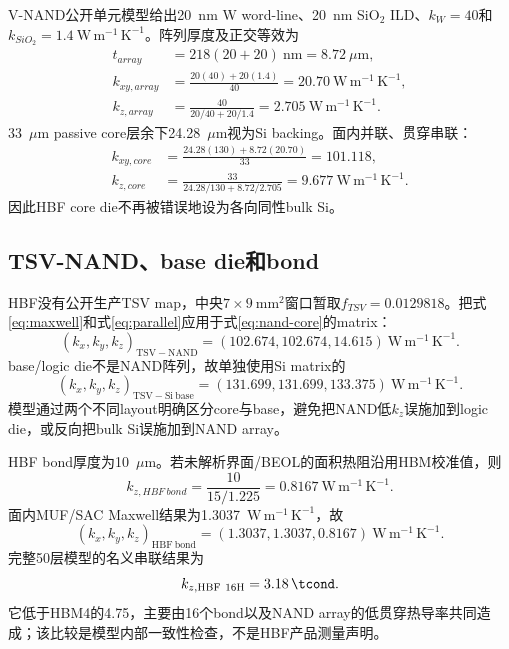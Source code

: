 \documentclass[UTF8,zihao=-4]{ctexart}
\newcommand{\kxyz}{(k_x,k_y,k_z)}
\newcommand{\unitk}{\mathrm{W\,m^{-1}\,K^{-1}}}
\begin{document}
V-NAND公开单元模型给出20~nm W word-line、20~nm SiO$_2$ ILD、$k_W=40$和$k_{SiO_2}=1.4~\unitk$\cite{KimRyuLee2025}。阵列厚度及正交等效为
\begin{align}
  t_{array}&=218(20+20)~\mathrm{nm}=8.72~\mu\mathrm{m},\\
  k_{xy,array}&=\frac{20(40)+20(1.4)}{40}=20.70~\unitk,\\
  k_{z,array}&=\frac{40}{20/40+20/1.4}=2.705~\unitk.
\end{align}
33~$\mu\mathrm{m}$ passive core层余下24.28~$\mu\mathrm{m}$视为Si backing。面内并联、贯穿串联：
\begin{align}
  k_{xy,core}&=\frac{24.28(130)+8.72(20.70)}{33}=101.118,\\
  k_{z,core}&=\frac{33}{24.28/130+8.72/2.705}=9.677~\unitk.
  \label{eq:nand-core}
\end{align}
因此HBF core die不再被错误地设为各向同性bulk Si。

\subsection{TSV-NAND、base die和bond}

HBF没有公开生产TSV map，中央$7\times9~\mathrm{mm^2}$窗口暂取$f_{TSV}=0.0129818$。把式\eqref{eq:maxwell}和式\eqref{eq:parallel}应用于式\eqref{eq:nand-core}的matrix：
\begin{equation}
  \kxyz_{\mathrm{TSV-NAND}}=(102.674,102.674,14.615)~\unitk.
\end{equation}
base/logic die不是NAND阵列，故单独使用Si matrix的
\begin{equation}
  \kxyz_{\mathrm{TSV-Si\ base}}=(131.699,131.699,133.375)~\unitk.
\end{equation}
模型通过两个不同layout明确区分core与base，避免把NAND低$k_z$误施加到logic die，或反向把bulk Si误施加到NAND array。

HBF bond厚度为10~$\mu\mathrm{m}$。若未解析界面/BEOL的面积热阻沿用HBM校准值，则
\begin{equation}
  k_{z,HBF\ bond}=\frac{10}{15/1.225}=0.8167~\unitk.
\end{equation}
面内MUF/SAC Maxwell结果为1.3037~$\unitk$，故
\begin{equation}
  \kxyz_{\mathrm{HBF\ bond}}=(1.3037,1.3037,0.8167)~\unitk.
\end{equation}
完整50层模型的名义串联结果为
\begin{equation}
  k_{z,\mathrm{HBF\ 16H}}=\SI{3.18}{\tcond}.
\end{equation}
它低于HBM4的\SI{4.75}{\tcond}，主要由16个bond以及NAND array的低贯穿热导率共同造成；该比较是模型内部一致性检查，不是HBF产品测量声明。
\end{document}
